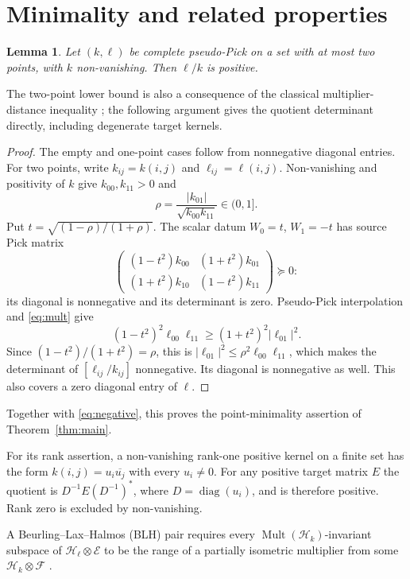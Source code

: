 \documentclass[11pt]{article}
\newtheorem{lemma}[theorem]{Lemma}
\newcommand{\psd}{\succeq0}
\newcommand{\HH}{\mathcal H}
\newcommand{\Mult}{\operatorname{Mult}}
\newcommand{\diag}{\operatorname{diag}}
\begin{document}
\section{Minimality and related properties}
\begin{lemma}\label{lem:two}
Let $(k,\ell)$ be complete pseudo-Pick on a set with at most two points,
with $k$ non-vanishing. Then $\ell/k$ is positive.
\end{lemma}
The two-point lower bound is also a consequence of the classical
multiplier-distance inequality \cite[Proposition 4]{ARSW}; the following
argument gives the quotient determinant directly, including degenerate
target kernels.
\begin{proof}
The empty and one-point cases follow from nonnegative diagonal entries.
For two points, write $k_{ij}=k(i,j)$ and $\ell_{ij}=\ell(i,j)$.
Non-vanishing and positivity of $k$ give $k_{00},k_{11}>0$ and
\[
  \rho=\frac{|k_{01}|}{\sqrt{k_{00}k_{11}}}\in(0,1].
\]
Put $t=\sqrt{(1-\rho)/(1+\rho)}$. The scalar datum $W_0=t$, $W_1=-t$
has source Pick matrix
\[
 \begin{pmatrix}(1-t^2)k_{00}&(1+t^2)k_{01}\\
 (1+t^2)k_{10}&(1-t^2)k_{11}\end{pmatrix}\psd:
\]
its diagonal is nonnegative and its determinant is zero.
Pseudo-Pick interpolation and \eqref{eq:mult} give
\[
 (1-t^2)^2\ell_{00}\ell_{11}
 \geq (1+t^2)^2|\ell_{01}|^2.
\]
Since $(1-t^2)/(1+t^2)=\rho$, this is
$|\ell_{01}|^2\leq\rho^2\ell_{00}\ell_{11}$, which makes the
determinant of $[\ell_{ij}/k_{ij}]$ nonnegative. Its diagonal is
nonnegative as well. This also covers a zero diagonal entry of $\ell$.
\end{proof}
Together with \eqref{eq:negative}, this proves the point-minimality
assertion of Theorem~\ref{thm:main}.

For its rank assertion, a non-vanishing rank-one positive kernel on a
finite set has the form $k(i,j)=u_i\overline{u_j}$ with every $u_i\ne0$.
For any positive target matrix $E$ the quotient is
$D^{-1}E(D^{-1})^*$, where $D=\diag(u_i)$, and is therefore positive.
Rank zero is excluded by non-vanishing.

A Beurling--Lax--Halmos (BLH) pair requires every
$\Mult(\HH_k)$-invariant subspace of $\HH_\ell\otimes\mathcal E$
to be the range of a partially isometric multiplier from some
$\HH_k\otimes\mathcal F$ \cite[Definition 1.2]{LMT}.
\end{document}
